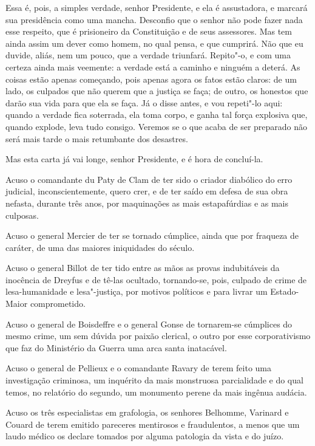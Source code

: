 Essa é, pois, a simples verdade, senhor Presidente, e ela é
assustadora, e marcará sua presidência como uma mancha. Desconfio que o 
senhor não pode fazer nada esse respeito, que é prisioneiro da
Constituição e de seus assessores. Mas tem ainda assim um dever como homem, 
no qual pensa, e que cumprirá. Não que eu duvide, aliás, nem um pouco, que a 
verdade triunfará. Repito"-o, e com uma certeza ainda mais veemente: 
a verdade está a caminho e ninguém a deterá. As coisas estão apenas 
começando, pois apenas agora os fatos estão claros: de um lado,
os culpados que não querem que a justiça se faça; de outro, os honestos
que darão sua vida para que ela se faça. Já o disse antes, e vou
repeti"-lo aqui: quando a verdade fica soterrada, ela toma corpo, e
ganha tal força explosiva que, quando explode, leva tudo consigo.
Veremos se o que acaba de ser preparado não será mais tarde o mais retumbante dos desastres.

 Mas esta carta já vai longe, senhor Presidente, e é hora de concluí-la.

 Acuso o comandante du Paty de Clam de ter sido o criador
diabólico do erro judicial, inconscientemente, quero crer, e de ter
saído em defesa de sua obra nefasta, durante três anos, por maquinações
as mais estapafúrdias e as mais culposas.

Acuso o general Mercier de ter se tornado cúmplice, ainda que por
fraqueza de caráter, de uma das maiores iniquidades do século.

Acuso o general Billot de ter tido entre as mãos as provas
indubitáveis da inocência de Dreyfus e de tê-las ocultado,
tornando-se, pois, culpado de crime de lesa-humanidade e lesa"-justiça,
por motivos políticos e para livrar um Estado-Maior comprometido.

Acuso o general de Boisdeffre e o general Gonse de tornarem-se
cúmplices do mesmo crime, um sem dúvida por paixão clerical, o outro
por esse corporativismo que faz do Ministério da Guerra uma arca santa
inatacável.

Acuso o general de Pellieux e o comandante Ravary de terem feito uma
investigação criminosa, um inquérito da mais monstruosa parcialidade
e do qual temos, no relatório do segundo, um monumento perene da mais ingênua audácia.

Acuso os três especialistas em grafologia, os senhores Belhomme,
Varinard e Couard de terem emitido pareceres mentirosos e fraudulentos, a
menos que um laudo médico os declare tomados por alguma patologia da
vista e do juízo.

